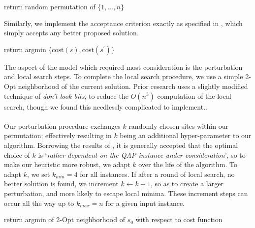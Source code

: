 \documentclass[a4paper,10pt]{article}
\begin{document}
\begin{algorithm}
\begin{algorithmic}
        \State return random permutation of $\{1,\dots,n\}$
    \EndProcedure
\end{algorithmic}
\end{algorithm}
Similarly, we implement the acceptance criterion exactly as specified in \cite{stuzle}, which simply accepts any better proposed solution. 
\begin{algorithm}
\begin{algorithmic}
        \State return argmin $\{\text{cost}(s), \text{cost}(s^\prime)\}$
    \EndProcedure
\end{algorithmic}
\end{algorithm}

The aspect of the model which required most consideration is the perturbation and local search steps. To complete the local search procedure, we use a simple 2-Opt neighborhood of the current solution. Prior research \cite{stuzle} uses a slightly modified technique of \textit{don't look bits}, to reduce the $O(n^3)$ computation of the local search, though we found this needlessly complicated to implement.. \\
\\
Our perturbation procedure exchanges $k$ randomly chosen sites within our permutation; effectively resulting in $k$ being an additional hyper-parameter to our algorithm. Borrowing the results of \cite{stuzle}, it is generally accepted that the optimal choice of $k$ is `\textit{rather dependent on the QAP instance under consideration}', so to make our heuristic more robust, we adapt $k$ over the life of the algorithm.  To adapt $k$, we set $k_{min} = 4$ for all instances. If after a round of local search, no better solution is found, we increment $k \leftarrow k+1$, so as to create a larger perturbation, and more likely to escape local minima. These increment steps can occur all the way up to $k_{max} = n$ for a given input instance. 
 
\begin{algorithm}
\begin{algorithmic}
        \State return argmin of 2-Opt neighborhood of $s_0$ with respect to cost function
    \EndProcedure
\end{algorithmic}
\end{algorithm}
\end{document}
